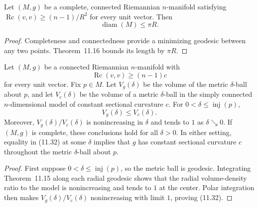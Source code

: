 \begin{corollary}
\label{cor:diameter-ricci-bounded}


Let $(M,g)$ be a complete, connected Riemannian $n$-manifold satisfying
$\operatorname{Rc}(v,v)\geq(n-1)/R^2$ for every unit vector. Then
\[
\operatorname{diam}(M)\leq\pi R.
\]

\begin{proof}
\sketch Completeness and connectedness provide a minimizing geodesic between
any two points. Theorem~11.16 bounds its length by $\pi R$.
\end{proof}
\end{corollary}

\begin{theorem}
\label{thm:bishop-gromov-volume-comparison}


Let $(M,g)$ be a connected Riemannian $n$-manifold with
\[
\operatorname{Rc}(v,v)\geq(n-1)c
\]
for every unit vector. Fix $p\in M$. Let $V_g(\delta)$ be the volume of the
metric $\delta$-ball about $p$, and let $V_c(\delta)$ be the volume of a
metric $\delta$-ball in the simply connected $n$-dimensional model of
constant sectional curvature $c$. For
$0<\delta\leq\operatorname{inj}(p)$,
\begin{equation}
V_g(\delta)\leq V_c(\delta).
\tag{11.32}
\end{equation}
Moreover, $V_g(\delta)/V_c(\delta)$ is nonincreasing in $\delta$ and tends to
$1$ as $\delta\searrow0$. If $(M,g)$ is complete, these conclusions hold for
all $\delta>0$. In either setting, equality in (11.32) at some $\delta$
implies that $g$ has constant sectional curvature $c$ throughout the metric
$\delta$-ball about $p$.

\begin{proof}
\sketch First suppose
$0<\delta\leq\operatorname{inj}(p)$, so the metric ball is geodesic.
Integrating Theorem~11.15 along each radial geodesic shows that the radial
volume-density ratio to the model is nonincreasing and tends to $1$ at the
center. Polar integration then makes
$V_g(\delta)/V_c(\delta)$ nonincreasing with limit $1$, proving (11.32).


\end{proof}
\end{theorem}
